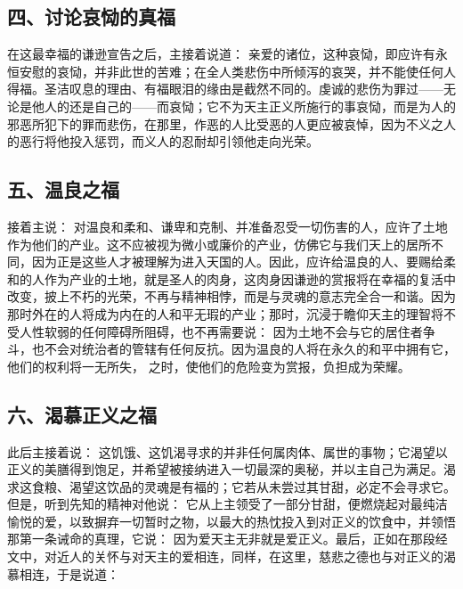 \subsection{四、讨论哀恸的真福}

在这最幸福的谦逊宣告之后，主接着说道： 亲爱的诸位，这种哀恸，即应许有永恒安慰的哀恸，并非此世的苦难；在全人类悲伤中所倾泻的哀哭，并不能使任何人得福。圣洁叹息的理由、有福眼泪的缘由是截然不同的。虔诚的悲伤为罪过——无论是他人的还是自己的——而哀恸；它不为天主正义所施行的事哀恸，而是为人的邪恶所犯下的罪而悲伤，在那里，作恶的人比受恶的人更应被哀悼，因为不义之人的恶行将他投入惩罚，而义人的忍耐却引领他走向光荣。\par


\subsection{五、温良之福}

接着主说： 对温良和柔和、谦卑和克制、并准备忍受一切伤害的人，应许了土地作为他们的产业。这不应被视为微小或廉价的产业，仿佛它与我们天上的居所不同，因为正是这些人才被理解为进入天国的人。因此，应许给温良的人、要赐给柔和的人作为产业的土地，就是圣人的肉身，这肉身因谦逊的赏报将在幸福的复活中改变，披上不朽的光荣，不再与精神相悖，而是与灵魂的意志完全合一和谐。因为那时外在的人将成为内在的人和平无瑕的产业；那时，沉浸于瞻仰天主的理智将不受人性软弱的任何障碍所阻碍，也不再需要说： 因为土地不会与它的居住者争斗，也不会对统治者的管辖有任何反抗。因为温良的人将在永久的和平中拥有它，他们的权利将一无所失， 之时，使他们的危险变为赏报，负担成为荣耀。\par


\subsection{六、渴慕正义之福}

此后主接着说： 这饥饿、这饥渴寻求的并非任何属肉体、属世的事物；它渴望以正义的美膳得到饱足，并希望被接纳进入一切最深的奥秘，并以主自己为满足。渴求这食粮、渴望这饮品的灵魂是有福的；它若从未尝过其甘甜，必定不会寻求它。但是，听到先知的精神对他说： 它从上主领受了一部分甘甜，便燃烧起对最纯洁愉悦的爱，以致摒弃一切暂时之物，以最大的热忱投入到对正义的饮食中，并领悟那第一条诫命的真理，它说： 因为爱天主无非就是爱正义。最后，正如在那段经文中，对近人的关怀与对天主的爱相连，同样，在这里，慈悲之德也与对正义的渴慕相连，于是说道：\par

